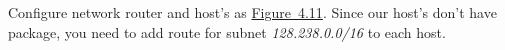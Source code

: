 \documentclass{../UTNetLab}
\begin{document}

Configure network router and host’s as \hyperref[fig:4.11]{Figure~4.11}.
Since our host’s don’t have  package, you need to add route for subnet \textit{128.238.0.0/16} to each host.
\end{document}
